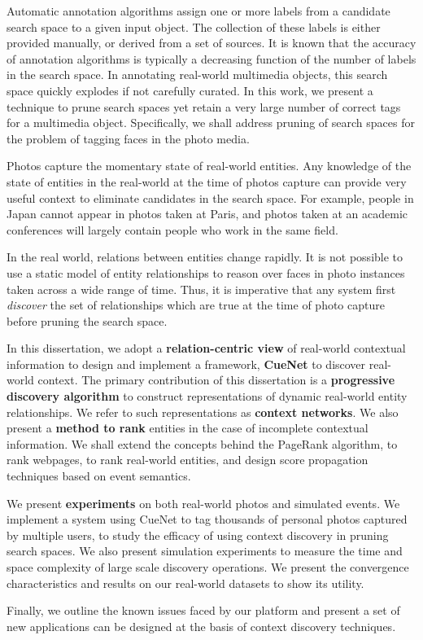 \thesisabstract
{
Automatic annotation algorithms assign one or more labels from a candidate search space to a given input object. The collection of these labels is either provided manually, or derived from a set of sources. It is known that the accuracy of annotation algorithms is typically a decreasing function of the number of labels in the search space. In annotating real-world multimedia objects, this search space quickly explodes if not carefully curated. In this work, we present a technique to prune search spaces yet retain a very large number of correct tags for a multimedia object. Specifically, we shall address pruning of search spaces for the problem of tagging faces in the photo media.

Photos capture the momentary state of real-world entities. Any knowledge of the state of entities in the real-world at the time of photos capture can provide very useful context to eliminate candidates in the search space. For example, people in Japan cannot appear in photos taken at Paris, and photos taken at an academic conferences will largely contain people who work in the same field. 

In the real world, relations between entities change rapidly. It is not possible to use a static model of entity relationships to reason over faces in photo instances taken across a wide range of time. Thus, it is imperative that any system first \textit{discover} the set of relationships which are true at the time of photo capture before pruning the search space.

In this dissertation, we adopt a \textbf{relation-centric view} of real-world contextual information to design and implement a framework, \textbf{CueNet} to discover real-world context. The primary contribution of this dissertation is a \textbf{progressive discovery algorithm} to construct representations of dynamic real-world entity relationships. We refer to such representations as \textbf{context networks}. We also present a \textbf{method to rank} entities in the case of incomplete contextual information. We shall extend the concepts behind the PageRank algorithm, to rank webpages, to rank real-world entities, and design score propagation techniques based on event semantics. 

We present \textbf{experiments} on both real-world photos and simulated events. We implement a system using CueNet to tag thousands of personal photos captured by multiple users, to study the efficacy of using context discovery in pruning search spaces. We also present simulation experiments to measure the time and space complexity of large scale discovery operations. We present the convergence characteristics and results on our real-world datasets to show its utility. 

Finally, we outline the known issues faced by our platform and present a set of new applications can be designed at the basis of context discovery techniques.
}


